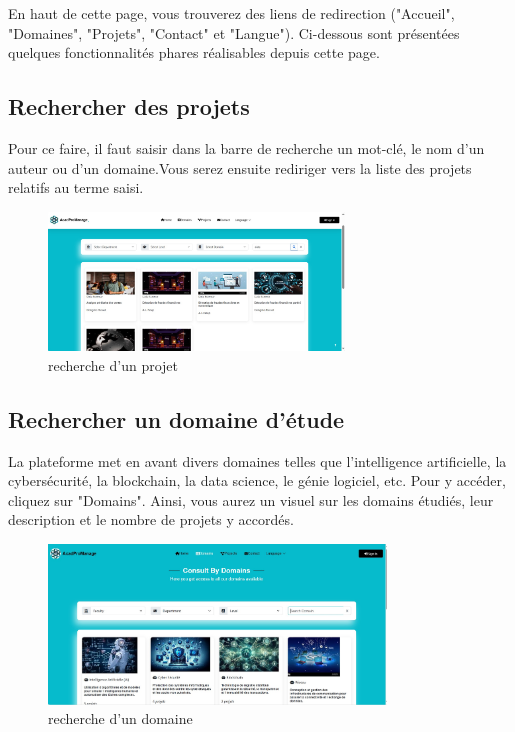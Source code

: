 \documentclass[12pt]{article}
\begin{document}
\medskip
En haut de cette page, vous trouverez des liens de redirection ("Accueil", "Domaines", "Projets", "Contact" et "Langue"). Ci-dessous sont présentées quelques fonctionnalités phares réalisables depuis cette page.
\medskip
\subsection{Rechercher des projets }
Pour ce faire, il faut saisir dans la barre de recherche un mot-clé, le nom d'un auteur ou d'un domaine.Vous serez ensuite rediriger vers la liste des projets relatifs au terme saisi. 
\medskip

\begin{figure}[h!]
    \centering
    \includegraphics[width=0.7\textwidth]{./images/search-project.jpg}
    \caption{recherche d'un projet}
    \label{fig:recherche d'un projet}
\end{figure}

\medskip
\subsection{Rechercher un domaine d'étude }
La plateforme met en avant divers domaines telles que l'intelligence artificielle, la cybersécurité, la blockchain, la data science, le génie logiciel, etc. Pour y accéder, cliquez sur "Domains". Ainsi, vous aurez un visuel sur les domains étudiés, leur description et le nombre de projets y accordés.   
\medskip

\begin{figure}[h!]
    \centering
    \includegraphics[width=0.8\textwidth]{./images/search-domain.jpg}
    \caption{recherche d'un domaine}
    \label{fig:recherche d'un domaine}
\end{figure}
\end{document}
